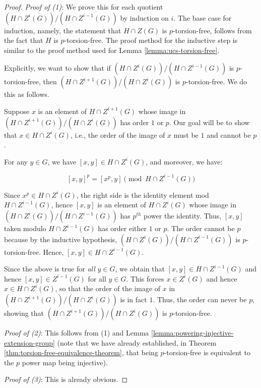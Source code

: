 \begin{proof}
  {\em Proof of (1)}: We prove this for each quotient $(H \cap
  Z^i(G))/(H \cap Z^{i-1}(G))$ by induction on $i$. The base case for
  induction, namely, the statement that $H \cap Z(G)$ is
  $p$-torsion-free, follows from the fact that $H$ is
  $p$-torsion-free. The proof method for the inductive step is similar
  to the proof method used for Lemma \ref{lemma:ucs-torsion-free}.

  Explicitly, we want to show that if $(H \cap Z^i(G))/(H \cap
  Z^{i-1}(G))$ is $p$-torsion-free, then $(H \cap Z^{i+1}(G))/(H \cap
  Z^i(G))$ is $p$-torsion-free. We do this as follows.

  Suppose $x$ is an element of $H \cap Z^{i+1}(G)$ whose image in $(H
  \cap Z^{i+1}(G))/(H \cap Z^i(G))$ has order $1$ or $p$. Our goal
  will be to show that $x \in H \cap Z^i(G)$, i.e., the order of the
  image of $x$ must be $1$ and cannot be $p$.

  For any $y \in G$, we have $[x,y] \in H \cap Z^i(G)$, and moreover, we
  have:

  $$[x,y]^p = [x^p,y] \pmod{H \cap Z^{i-1}(G)}$$

  Since $x^p \in H \cap Z^i(G)$, the right side is the identity
  element mod $H \cap Z^{i-1}(G)$, hence $[x,y]$ is an element of $H
  \cap Z^i(G)$ whose image in $(H \cap Z^i(G))/(H \cap Z^{i-1}(G))$
  has $p^{th}$ power the identity. Thus, $[x,y]$ taken modulo $H \cap
  Z^{i-1}(G)$ has order either $1$ or $p$. The order cannot be $p$
  because by the inductive hypothesis, $(H \cap Z^i(G))/(H \cap
  Z^{i-1}(G))$ is $p$-torsion-free. Hence, $[x,y] \in H \cap Z^{i-1}(G)$.

  Since the above is true for {\em all} $y \in G$, we obtain that
  $[x,y] \in H \cap Z^{i-1}(G)$ and hence $[x,y] \in Z^{i-1}(G)$ for
  all $y \in G$. This forces $x \in Z^i(G)$ and hence $x \in H \cap
  Z^i(G)$, so that the order of the image of $x$ in $(H \cap
  Z^{i+1}(G))/(H \cap Z^i(G))$ is in fact $1$. Thus, the order can
  never be $p$, showing that $(H \cap Z^{i+1}(G))/(H \cap Z^i(G))$ is
  $p$-torsion-free.

  {\em Proof of (2)}: This follows from (1) and Lemma
  \ref{lemma:powering-injective-extension-group} (note that we have already
  established, in Theorem \ref{thm:torsion-free-equivalence-theorem}, that
  being $p$-torsion-free is equivalent to the $p$ power map being
  injective).

  {\em Proof of (3)}: This is already obvious.
\end{proof}

